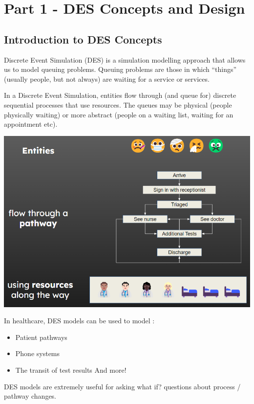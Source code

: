 \documentclass[
  letterpaper,
  DIV=11,
  numbers=noendperiod]{scrreprt}
\providecommand{\tightlist}{%
  \setlength{\itemsep}{0pt}\setlength{\parskip}{0pt}}\usepackage{longtable,booktabs,array}
\begin{document}
\part{Part 1 - DES Concepts and Design}

\chapter{Introduction to DES
Concepts}\label{introduction-to-des-concepts}

Discrete Event Simulation (DES) is a simulation modelling approach that
allows us to model queuing problems. Queuing problems are those in which
``things'' (usually people, but not always) are waiting for a service or
services.

In a Discrete Event Simulation, entities flow through (and queue for)
discrete sequential processes that use resources. The queues may be
physical (people physically waiting) or more abstract (people on a
waiting list, waiting for an appointment etc).

\includegraphics{images/example.png}

In healthcare, DES models can be used to model :

\begin{itemize}
\tightlist
\item
  Patient pathways
\item
  Phone systems
\item
  The transit of test results And more!
\end{itemize}

DES models are extremely useful for asking what if? questions about
process / pathway changes.
\end{document}
